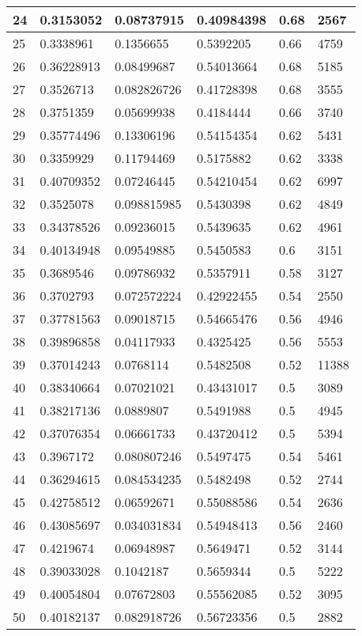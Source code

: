 \begin{longtable}{|l|l|l|l|l|l|}
24 & 0.3153052 & 0.08737915 & 0.40984398 & 0.68 & 2567 \\ \hline 
25 & 0.3338961 & 0.1356655 & 0.5392205 & 0.66 & 4759 \\ \hline 
26 & 0.36228913 & 0.08499687 & 0.54013664 & 0.68 & 5185 \\ \hline 
27 & 0.3526713 & 0.082826726 & 0.41728398 & 0.68 & 3555 \\ \hline 
28 & 0.3751359 & 0.05699938 & 0.4184444 & 0.66 & 3740 \\ \hline 
29 & 0.35774496 & 0.13306196 & 0.54154354 & 0.62 & 5431 \\ \hline 
30 & 0.3359929 & 0.11794469 & 0.5175882 & 0.62 & 3338 \\ \hline 
31 & 0.40709352 & 0.07246445 & 0.54210454 & 0.62 & 6997 \\ \hline 
32 & 0.3525078 & 0.098815985 & 0.5430398 & 0.62 & 4849 \\ \hline 
33 & 0.34378526 & 0.09236015 & 0.5439635 & 0.62 & 4961 \\ \hline 
34 & 0.40134948 & 0.09549885 & 0.5450583 & 0.6 & 3151 \\ \hline 
35 & 0.3689546 & 0.09786932 & 0.5357911 & 0.58 & 3127 \\ \hline 
36 & 0.3702793 & 0.072572224 & 0.42922455 & 0.54 & 2550 \\ \hline 
37 & 0.37781563 & 0.09018715 & 0.54665476 & 0.56 & 4946 \\ \hline 
38 & 0.39896858 & 0.04117933 & 0.4325425 & 0.56 & 5553 \\ \hline 
39 & 0.37014243 & 0.0768114 & 0.5482508 & 0.52 & 11388 \\ \hline 
40 & 0.38340664 & 0.07021021 & 0.43431017 & 0.5 & 3089 \\ \hline 
41 & 0.38217136 & 0.0889807 & 0.5491988 & 0.5 & 4945 \\ \hline 
42 & 0.37076354 & 0.06661733 & 0.43720412 & 0.5 & 5394 \\ \hline 
43 & 0.3967172 & 0.080807246 & 0.5497475 & 0.54 & 5461 \\ \hline 
44 & 0.36294615 & 0.084534235 & 0.5482498 & 0.52 & 2744 \\ \hline 
45 & 0.42758512 & 0.06592671 & 0.55088586 & 0.54 & 2636 \\ \hline 
46 & 0.43085697 & 0.034031834 & 0.54948413 & 0.56 & 2460 \\ \hline 
47 & 0.4219674 & 0.06948987 & 0.5649471 & 0.52 & 3144 \\ \hline 
48 & 0.39033028 & 0.1042187 & 0.5659344 & 0.5 & 5222 \\ \hline 
49 & 0.40054804 & 0.07672803 & 0.55562085 & 0.52 & 3095 \\ \hline 
50 & 0.40182137 & 0.082918726 & 0.56723356 & 0.5 & 2882 \\ \hline 
\end{longtable}